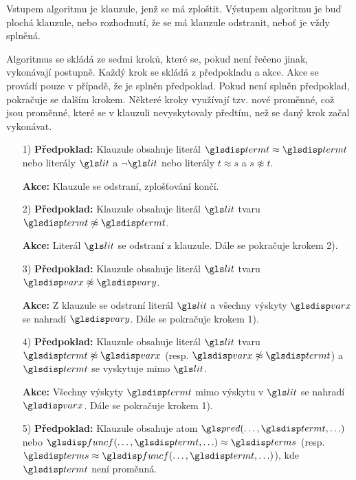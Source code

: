 Vstupem algoritmu je klauzule, jenž se má zploštit.
Výstupem algoritmu je buď plochá klauzule, nebo rozhodnutí,
že se má klauzule odstranit, neboť je vždy splněná.

Algoritmus se skládá ze sedmi kroků, které se, pokud
není řečeno jinak, vykonávají postupně.
Každý krok se skládá z předpokladu a akce.
Akce se provádí pouze v případě, že je splněn předpoklad.
Pokud není splněn předpoklad, pokračuje se dalším krokem.
Některé kroky využívají tzv. nové proměnné, což
jsou proměnné, které se v klauzuli nevyskytovaly
předtím, než se daný krok začal vykonávat.

{
\def\assumpt{\textbf{Předpoklad:}}
\def\action{\textbf{Akce:}}
\def\goto#1{Dále se pokračuje krokem #1).}
\begin{itemize}
\item[1)]
\assumpt{} Klauzule obsahuje literál $\term \approx \term$ nebo
literály $\lit$ a $\neg \lit$ nebo literály $t \approx s$
a $s \not\approx t$.

\action{} Klauzule se odstraní, zplošťování končí.

\item[2)]
\assumpt{} Klauzule obsahuje literál $\lit$ tvaru $\term \not\approx \term$.

\action{} Literál $\lit$ se odstraní z klauzule.
\goto{2}

\item[3)]
\assumpt{} Klauzule obsahuje literál
$\lit$ tvaru $\var \not\approx \varY$.

\action{} Z klauzule se odstraní literál $\lit$ a všechny
výskyty $\var$ se nahradí $\varY$.
\goto{1}


\item[4)]
\assumpt{} Klauzule obsahuje literál $\lit$ tvaru
$\term \not\approx \var$ (resp. $\var \not\approx \term$) a
$\term$ se vyskytuje mimo $\lit$.

\action{} Všechny výskyty $\term$ mimo výskytu v $\lit$ se nahradí $\var$.
\goto{1}


\item[5)]
\assumpt{} Klauzule obsahuje atom
$\pred(\ldots, \term, \ldots)$ nebo
$\func(\ldots, \term, \ldots) \approx \termS$
(resp. $\termS \approx \func(\ldots, \term, \ldots)$),
kde $\term$ není proměnná.


\end{itemize}}

